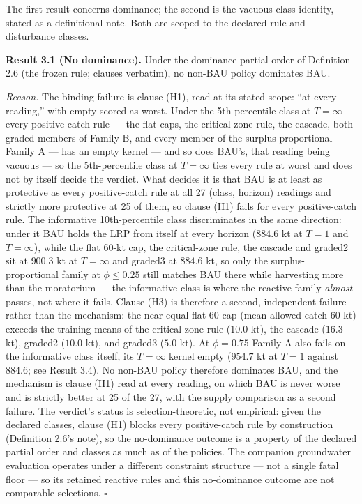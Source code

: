 \documentclass[11pt]{article}
\begin{document}
The first result concerns dominance; the second is the vacuous-class
identity, stated as a definitional note. Both are scoped to the declared
rule and disturbance classes.

\textbf{Result 3.1 (No dominance).} Under the dominance partial order of
Definition 2.6 (the frozen rule; clauses verbatim), no non-BAU policy
dominates BAU.

\emph{Reason.} The binding failure is clause (H1), read at its stated
scope: ``at every reading,'' with empty scored as worst. Under the
5th-percentile class at \(T=\infty\) every positive-catch rule --- the
flat caps, the critical-zone rule, the cascade, both graded members of
Family B, and every member of the surplus-proportional Family A --- has
an empty kernel --- and so does BAU's, that reading being vacuous ---
so the 5th-percentile class at \(T = \infty\) ties every rule at worst
and does not by itself decide the verdict. What decides it is that BAU
is at least as protective as every positive-catch rule at all 27
(class, horizon) readings and strictly more protective at 25 of them,
so clause (H1) fails for every positive-catch rule. The informative
10th-percentile class discriminates in the same direction: under it BAU
holds the LRP from itself at every horizon (\(884.6\) kt at \(T = 1\)
and \(T = \infty\)), while the flat 60-kt cap, the critical-zone rule,
the cascade and graded2 sit at \(900.3\) kt at \(T = \infty\) and
graded3 at \(884.6\) kt, so only the surplus-proportional family at
\(\phi \le 0.25\) still matches BAU there while harvesting more than the
moratorium --- the informative class is where the reactive family
\emph{almost} passes, not where it fails.
Clause (H3) is therefore a second, independent failure rather than the
mechanism: the near-equal flat-60 cap (mean allowed catch \(60\)
kt) exceeds the training means of the critical-zone rule (\(10.0\) kt),
the cascade (\(16.3\) kt), graded2 (\(10.0\) kt), and graded3 (\(5.0\)
kt). At \(\phi = 0.75\) Family A also fails on the informative class
itself, its \(T=\infty\) kernel empty (\(954.7\) kt at \(T=1\) against
\(884.6\); see Result 3.4). No non-BAU policy therefore dominates BAU,
and the mechanism is clause (H1) read at every reading, on which BAU is
never worse and is strictly better at 25 of the 27, with the supply
comparison as a second failure. The
verdict's status is selection-theoretic, not empirical: given the
declared classes, clause (H1) blocks every positive-catch rule by
construction (Definition 2.6's note), so the no-dominance outcome is a
property of the declared partial order and classes as much as of the
policies. The companion groundwater evaluation operates under a
different constraint structure --- not a single fatal floor --- so its
retained reactive rules and this no-dominance outcome are not comparable
selections. \ensuremath{\square}
\end{document}
